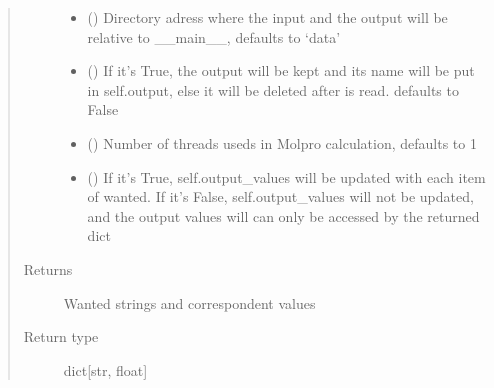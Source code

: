 \documentclass[letterpaper,10pt,english]{sphinxmanual}
\begin{document}
\begin{fulllineitems}
\begin{fulllineitems}
\begin{quote}
\begin{description}
\begin{itemize}
\item {} 
\sphinxAtStartPar
{} (\sphinxstyleliteralemphasis{\sphinxupquote{, }}) \textendash{} Directory adress where the input and the output will be relative to \_\_main\_\_, defaults to 
‘data’

\item {} 
\sphinxAtStartPar
{} (\sphinxstyleliteralemphasis{\sphinxupquote{, }}) \textendash{} If it’s True, the output will be kept and its name will be put in self.output, else it will 
be deleted after is read. defaults to False

\item {} 
\sphinxAtStartPar
{} (\sphinxstyleliteralemphasis{\sphinxupquote{, }}) \textendash{} Number of threads useds in Molpro calculation, defaults to 1

\item {} 
\sphinxAtStartPar
{} (\sphinxstyleliteralemphasis{\sphinxupquote{, }}) \textendash{} If it’s True, self.output\_values will be updated with each item of wanted. If it’s False, 
self.output\_values will not be updated, and the output values will can only be accessed by the returned dict

\end{itemize}

\item[{Returns}] \leavevmode
\sphinxAtStartPar
Wanted strings and correspondent values

\item[{Return type}] \leavevmode
\sphinxAtStartPar
dict{[}str, float{]}

\end{description}\end{quote}

\end{fulllineitems}



\end{fulllineitems}
\end{document}
